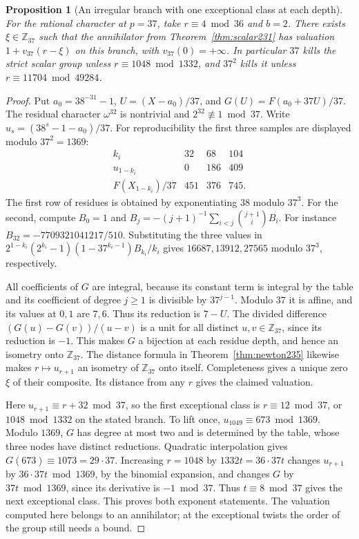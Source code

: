 \documentclass[a4paper,11pt]{article}
\newtheorem{proposition}{Proposition}[section]
\theoremstyle{definition}
\theoremstyle{remark}
\newcommand{\ZZ}{\mathbb Z}\newcommand{\ord}{\operatorname{ord}}
\numberwithin{equation}{section}
\begin{document}
\begin{proposition}[An irregular branch with one exceptional class at each depth]
\leavevmode\label{prop:example235}
For the rational character at \(p=37\), take \(r\equiv4\bmod36\)
and \(b=2\). There exists \(\xi\in\ZZ_{37}\) such that the
annihilator from Theorem~\ref{thm:scalar231} has valuation
\(1+v_{37}(r-\xi)\) on this branch, with \(v_{37}(0)=+\infty\).
In particular \(37\) kills the strict scalar group unless
\(r\equiv1048\bmod1332\), and \(37^2\) kills it unless
\(r\equiv11704\bmod49284\).
\end{proposition}
\begin{proof}
Put \(a_0=38^{-31}-1\), \(U=(X-a_0)/37\), and
\(G(U)=F(a_0+37U)/37\). The residual character \(\omega^{32}\)
is nontrivial and \(2^{32}\not\equiv1\bmod37\).
Write \(u_s=(38^s-1-a_0)/37\).
For reproducibility the first three samples are displayed
modulo \(37^2=1369\):
\[
\begin{array}{c|rrr}
 k_i&32&68&104\\ \hline
 u_{1-k_i}&0&186&409\\
 F(X_{1-k_i})/37&451&376&745 .
\end{array}
\]
The first row of residues is obtained by exponentiating \(38\)
modulo \(37^3\). For the second, compute \(B_0=1\) and
\(B_j=-(j+1)^{-1}\sum_{i<j}\binom{j+1}{i}B_i\).
For instance \(B_{32}=-7709321041217/510\).
Substituting the three values in
\(2^{1-k_i}(2^{k_i}-1)(1-37^{k_i-1})B_{k_i}/k_i\)
gives \(16687,13912,27565\) modulo \(37^3\), respectively.

All coefficients of \(G\) are integral, because its constant
term is integral by the table and its coefficient of degree
\(j\ge1\) is divisible by \(37^{j-1}\). Modulo \(37\) it is
affine, and its values at \(0,1\) are \(7,6\). Thus its
reduction is \(7-U\). The divided difference
\((G(u)-G(v))/(u-v)\) is a unit for all distinct \(u,v\in
\ZZ_{37}\), since its reduction is \(-1\). This makes \(G\)
a bijection at each residue depth, and hence an isometry onto
\(\ZZ_{37}\). The distance formula in Theorem~\ref{thm:newton235}
likewise makes \(r\mapsto u_{r+1}\) an isometry of \(\ZZ_{37}\)
onto itself. Completeness gives a unique zero \(\xi\) of their
composite. Its distance from any \(r\) gives the claimed valuation.

Here \(u_{r+1}\equiv r+32\bmod37\), so the first exceptional
class is \(r\equiv12\bmod37\), or \(1048\bmod1332\) on the
stated branch. To lift once, \(u_{1049}\equiv673\bmod1369\).
Modulo \(1369\), \(G\) has degree at most two and is determined
by the table, whose three nodes have distinct reductions.
Quadratic interpolation gives \(G(673)\equiv1073=29\cdot37\).
Increasing \(r=1048\) by \(1332t=36\cdot37t\) changes \(u_{r+1}\)
by \(36\cdot37t\bmod1369\), by the binomial expansion,
and changes \(G\) by \(37t\bmod1369\), since its derivative
is \(-1\bmod37\). Thus \(t\equiv8\bmod37\) gives the next
exceptional class. This proves both exponent statements. The
valuation computed here belongs to an annihilator; at the
exceptional twists the order of the group still needs a bound.
\end{proof}
\end{document}
